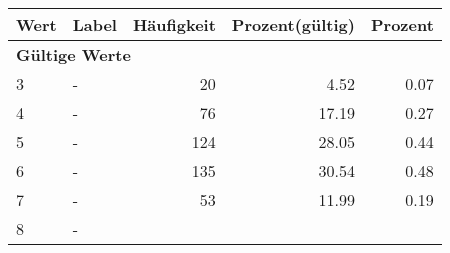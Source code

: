      \begin{longtable}{lXrrr}
     \toprule
     \textbf{Wert} & \textbf{Label} & \textbf{Häufigkeit} & \textbf{Prozent(gültig)} & \textbf{Prozent} \\
     \endhead
     \midrule
     \multicolumn{5}{l}{\textbf{Gültige Werte}}\\

     3 &
     \multicolumn{1}{X}{ -  } &


       \num{20} &
       \num[round-mode=places,round-precision=2]{4.52} &
         \num[round-mode=places,round-precision=2]{0.07} \\

     4 &
     \multicolumn{1}{X}{ -  } &


       \num{76} &
       \num[round-mode=places,round-precision=2]{17.19} &
         \num[round-mode=places,round-precision=2]{0.27} \\

     5 &
     \multicolumn{1}{X}{ -  } &


       \num{124} &
       \num[round-mode=places,round-precision=2]{28.05} &
         \num[round-mode=places,round-precision=2]{0.44} \\

     6 &
     \multicolumn{1}{X}{ -  } &


       \num{135} &
       \num[round-mode=places,round-precision=2]{30.54} &
         \num[round-mode=places,round-precision=2]{0.48} \\

     7 &
     \multicolumn{1}{X}{ -  } &


       \num{53} &
       \num[round-mode=places,round-precision=2]{11.99} &
         \num[round-mode=places,round-precision=2]{0.19} \\

     8 &
     \multicolumn{1}{X}{ -  } &



\end{longtable}
